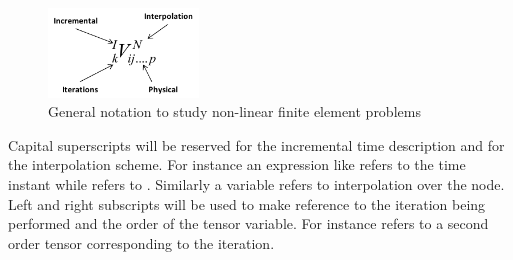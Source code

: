\begin{figure}[h]
\centering
\includegraphics[width=4cm]{img/figure1_1.pdf}
\caption{General notation to study non-linear finite element problems}
\label{fig:notation}
\end{figure}

Capital superscripts will be reserved for the incremental time description and for the interpolation scheme.  For instance an expression like   refers to the time instant   while   refers to . Similarly a variable   refers to interpolation over the node. Left and right subscripts will be used to make reference to the iteration being performed and the order of the tensor variable.  For instance   refers to a second order tensor corresponding to the iteration.